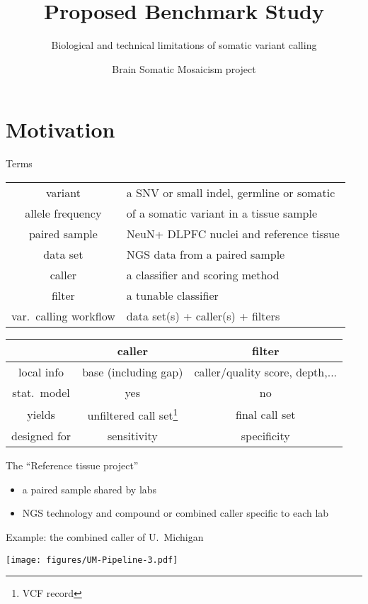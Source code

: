 \documentclass{beamer}
\title{Proposed Benchmark Study}
\subtitle{Biological and technical limitations of somatic variant calling}
\author{Brain Somatic Mosaicism project}
\date{}
\begin{document}
\maketitle

\section{Motivation}

\begin{frame}{Terms}
\small
\begin{tabular}{c|l}
variant & a SNV or small indel, germline or somatic \\
allele frequency & of a somatic variant in a tissue sample \\
paired sample & NeuN+ DLPFC nuclei and reference tissue \\
data set & NGS data from a paired sample \\
caller & a classifier and scoring method \\
filter & a tunable classifier \\
var.~calling workflow & data set(s) + caller(s) + filters \\
\end{tabular}

\vfill

\begin{tabular}{c|c|c}
 & caller & filter \\
\hline
local info & base (including gap) & caller/quality score, depth,... \\
stat.~model & yes & no \\
yields & unfiltered call set\footnote{VCF record} & final call set \\
designed for & sensitivity & specificity \\
\end{tabular}
\end{frame}

\begin{frame}{The ``Reference tissue project''}
\begin{itemize}
\item a paired sample shared by labs
\item NGS technology and compound or combined caller specific to each lab
\end{itemize}
\end{frame}

\begin{frame}{Example: the combined caller of U.~Michigan}
\begin{center}
\texttt{[image: figures/UM-Pipeline-3.pdf]}
\end{center}
\end{frame}
\end{document}
